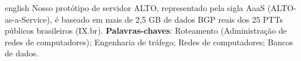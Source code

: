 \begin{resumo}
\begin{otherlanguage*}{english}
Nosso protótipo de servidor ALTO, representado pela sigla AaaS (ALTO-as-a-Service), é baseado em mais de 2,5 GB de dados BGP reais dos 25 PTTs públicos brasileiros (IX.br).
\vspace{\onelineskip}
\noindent\textbf{Palavras-chaves}: Roteamento (Administração de redes de computadores); Engenharia de tráfego; Redes de computadores; Bancos de dados.

\end{otherlanguage*}
\end{resumo}

\listoffigures*
\newpage

\listoftables*
\newpage

\printglossary[type=\acronymtype]
\newpage

\tableofcontents*
\cleardoublepage

%
\cleardoublepage
\setcounter{page}{17}

\textual





%


%
%

